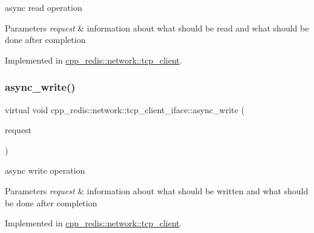 async read operation


\begin{DoxyParams}{Parameters}
{\em request} & information about what should be read and what should be done after completion \\
\hline
\end{DoxyParams}


Implemented in \hyperlink{classcpp__redis_1_1network_1_1tcp__client_a5eed4225fcd01e3108580d863c94c2cc}{cpp\+\_\+redis\+::network\+::tcp\+\_\+client}.

\mbox{\label{classcpp__redis_1_1network_1_1tcp__client__iface_a9cd01e8a68479456d15d6435ffad9b92}} 
\subsubsection{\texorpdfstring{async\+\_\+write()}{async\_write()}}
{\footnotesize\ttfamily virtual void cpp\+\_\+redis\+::network\+::tcp\+\_\+client\+\_\+iface\+::async\+\_\+write (\begin{DoxyParamCaption}\item[{\hyperlink{structcpp__redis_1_1network_1_1tcp__client__iface_1_1write__request}{write\+\_\+request} \&}]{request }\end{DoxyParamCaption})\hspace{0.3cm}{\ttfamily [pure virtual]}}

async write operation


\begin{DoxyParams}{Parameters}
{\em request} & information about what should be written and what should be done after completion \\
\hline
\end{DoxyParams}


Implemented in \hyperlink{classcpp__redis_1_1network_1_1tcp__client_a6d15785b71776cd85426c9634cb446f0}{cpp\+\_\+redis\+::network\+::tcp\+\_\+client}.

\mbox{\label{classcpp__redis_1_1network_1_1tcp__client__iface_a81ee982136e85b7c3401393341bc594c}} 
